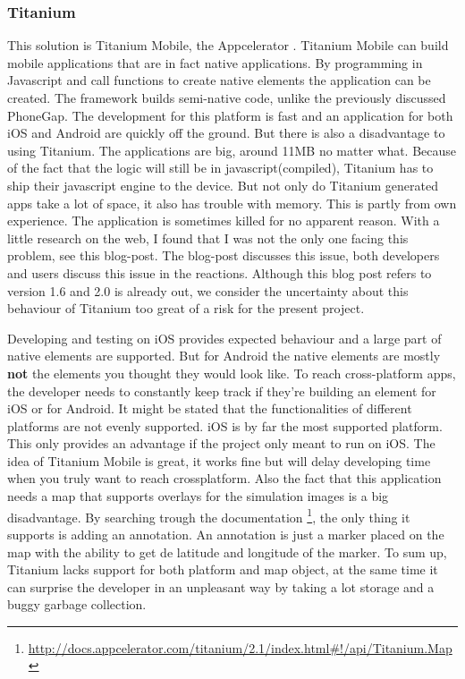 \subsubsection*{Titanium}
This solution is Titanium Mobile, the Appcelerator \cite{Titanium-Appcelerator}. Titanium Mobile can build mobile applications that are in fact native applications. By programming in Javascript and call functions to create native elements the application can be created. The framework builds semi-native code, unlike the previously discussed PhoneGap. The development for this platform is fast and an application for both iOS and Android are quickly off the ground. But there is also a disadvantage to using Titanium. The applications are big, around 11MB no matter what. Because of the fact that the logic will still be in javascript(compiled), Titanium has to ship their javascript engine to the device. But not only do Titanium generated apps take a lot of space, it also has trouble with memory. This is partly from own experience. The application is sometimes killed for no apparent reason. With a little research on the web, I found that I was not the only one facing this problem, see this blog-post\cite{memoryleak}. The blog-post discusses this issue, both developers and users discuss this issue in the reactions. Although this blog post refers to version 1.6 and 2.0 is already out, we consider the uncertainty about this behaviour of Titanium too great of a risk for the present project.

Developing and testing on iOS provides expected behaviour and a large part of native elements are supported. But for Android the native elements are mostly \textbf{not} the elements you thought they would look like. To reach cross-platform apps, the developer needs to constantly keep track if they're building an element for iOS or for Android. It might be stated that the functionalities of different platforms are not evenly supported. iOS is by far the most supported platform. This only provides an advantage if the project only meant to run on iOS. The idea of Titanium Mobile is great, it works fine but will delay developing time when you truly want to reach crossplatform. Also the fact that this application needs a map that supports overlays for the simulation images is a big disadvantage. By searching trough the documentation \footnote{\url{http://docs.appcelerator.com/titanium/2.1/index.html\#!/api/Titanium.Map}}, the only thing it supports is adding an annotation. An annotation is just a marker placed on the map with the ability to get de latitude and longitude of the marker. To sum up, Titanium lacks support for both platform and map object, at the same time it can surprise the developer in an unpleasant way by taking a lot storage and a buggy garbage collection.

